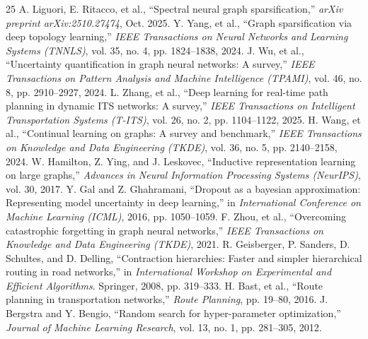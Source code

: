\documentclass[journal]{IEEEtran}
\begin{document}
\begin{thebibliography}{25}
A. Liguori, E. Ritacco, et al., ``Spectral neural graph sparsification,'' \textit{arXiv preprint arXiv:2510.27474}, Oct. 2025.
Y. Yang, et al., ``Graph sparsification via deep topology learning,'' \textit{IEEE Transactions on Neural Networks and Learning Systems (TNNLS)}, vol. 35, no. 4, pp. 1824--1838, 2024.
J. Wu, et al., ``Uncertainty quantification in graph neural networks: A survey,'' \textit{IEEE Transactions on Pattern Analysis and Machine Intelligence (TPAMI)}, vol. 46, no. 8, pp. 2910--2927, 2024.
L. Zhang, et al., ``Deep learning for real-time path planning in dynamic ITS networks: A survey,'' \textit{IEEE Transactions on Intelligent Transportation Systems (T-ITS)}, vol. 26, no. 2, pp. 1104--1122, 2025.
H. Wang, et al., ``Continual learning on graphs: A survey and benchmark,'' \textit{IEEE Transactions on Knowledge and Data Engineering (TKDE)}, vol. 36, no. 5, pp. 2140--2158, 2024.
W. Hamilton, Z. Ying, and J. Leskovec, ``Inductive representation learning on large graphs,'' \textit{Advances in Neural Information Processing Systems (NeurIPS)}, vol. 30, 2017.
Y. Gal and Z. Ghahramani, ``Dropout as a bayesian approximation: Representing model uncertainty in deep learning,'' in \textit{International Conference on Machine Learning (ICML)}, 2016, pp. 1050--1059.
F. Zhou, et al., ``Overcoming catastrophic forgetting in graph neural networks,'' \textit{IEEE Transactions on Knowledge and Data Engineering (TKDE)}, 2021.
R. Geisberger, P. Sanders, D. Schultes, and D. Delling, ``Contraction hierarchies: Faster and simpler hierarchical routing in road networks,'' in \textit{International Workshop on Experimental and Efficient Algorithms}. Springer, 2008, pp. 319--333.
H. Bast, et al., ``Route planning in transportation networks,'' \textit{Route Planning}, pp. 19--80, 2016.
J. Bergstra and Y. Bengio, ``Random search for hyper-parameter optimization,'' \textit{Journal of Machine Learning Research}, vol. 13, no. 1, pp. 281--305, 2012.
\end{thebibliography}
\end{document}
